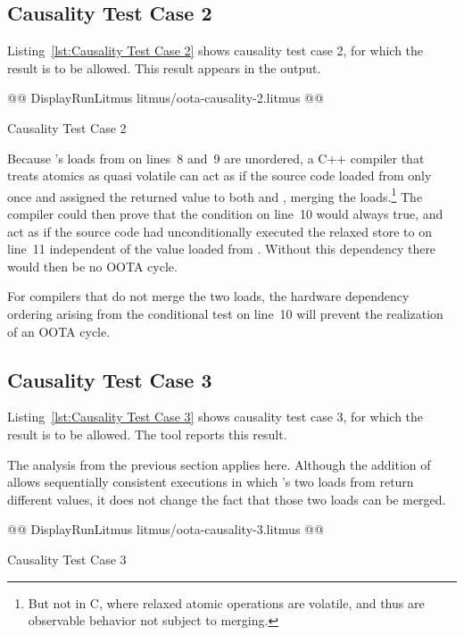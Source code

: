 \documentclass[10]{article}
\begin{document}
\subsection{Causality Test Case 2}
\label{app:Causality Test Case 2}

Listing~\ref{lst:Causality Test Case 2}
shows causality test case 2, for which the  result
is to be allowed.
This result appears in the  output.

\begin{listing}[tbp]
@@ DisplayRunLitmus litmus/oota-causality-2.litmus @@
\caption{Causality Test Case 2}
\label{lst:Causality Test Case 2}
\end{listing}

Because 's loads from  on lines~8 and~9 are unordered,
a C++ compiler that treats atomics as quasi volatile
can act as if the source code loaded from  only
once and assigned the returned value to both  and ,
merging the loads.\footnote{
	But not in C, where relaxed atomic operations are volatile,
	and thus are observable behavior not subject to merging.}
The compiler could then prove that the condition on line~10
would always true, and act as if the source code had
unconditionally executed the relaxed store to  on line~11
independent of the value loaded from .
Without this dependency there would then be no OOTA cycle.

For compilers that do not merge the two loads, the hardware
dependency ordering arising from the conditional test on line~10
will prevent the realization of an OOTA cycle.

\subsection{Causality Test Case 3}
\label{app:Causality Test Case 3}

Listing~\ref{lst:Causality Test Case 3}
shows causality test case 3, for which the  result
is to be allowed.
The  tool reports this result.

The analysis from the previous section applies here.
Although the addition of  allows sequentially consistent executions
in which 's two loads from  return different values,
it does not change the fact that those two loads can be merged.

\begin{listing}[tbp]
@@ DisplayRunLitmus litmus/oota-causality-3.litmus @@
\caption{Causality Test Case 3}
\label{lst:Causality Test Case 3}
\end{listing}
\end{document}
